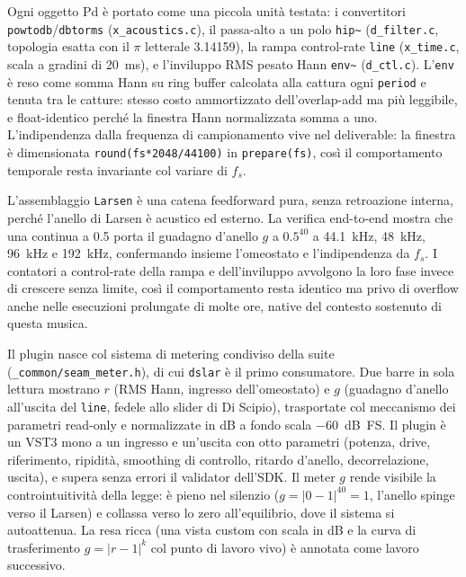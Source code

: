 \documentclass[11pt,a4paper]{article}
\begin{document}
Ogni oggetto Pd è portato come una piccola unità testata: i convertitori \texttt{powtodb}/\texttt{dbtorms} (\texttt{x\_acoustics.c}), il passa-alto a un polo \texttt{hip\textasciitilde} (\texttt{d\_filter.c}, topologia esatta con il $\pi$ letterale \num{3.14159}), la rampa control-rate \texttt{line} (\texttt{x\_time.c}, scala a gradini di \SI{20}{\milli\second}), e l'inviluppo RMS pesato Hann \texttt{env\textasciitilde} (\texttt{d\_ctl.c}).
L'\texttt{env} è reso come somma Hann su ring buffer calcolata alla cattura ogni \texttt{period} e tenuta tra le catture: stesso costo ammortizzato dell'overlap-add ma più leggibile, e float-identico perché la finestra Hann normalizzata somma a uno.
L'indipendenza dalla frequenza di campionamento vive nel deliverable: la finestra è dimensionata \texttt{round(fs*2048/44100)} in \texttt{prepare(fs)}, così il comportamento temporale resta invariante col variare di \(f_s\).

L'assemblaggio \texttt{Larsen} è una catena feedforward pura, senza retroazione interna, perché l'anello di Larsen è acustico ed esterno.
La verifica end-to-end mostra che una continua a \num{0.5} porta il guadagno d'anello \(g\) a \(0.5^{40}\) a \SI{44.1}{\kilo\hertz}, \SI{48}{\kilo\hertz}, \SI{96}{\kilo\hertz} e \SI{192}{\kilo\hertz}, confermando insieme l'omeostato e l'indipendenza da \(f_s\).
I contatori a control-rate della rampa e dell'inviluppo avvolgono la loro fase invece di crescere senza limite, così il comportamento resta identico ma privo di overflow anche nelle esecuzioni prolungate di molte ore, native del contesto sostenuto di questa musica.

Il plugin nasce col sistema di metering condiviso della suite (\texttt{\_common/seam\_meter.h}), di cui \texttt{dslar} è il primo consumatore.
Due barre in sola lettura mostrano \(r\) (RMS Hann, ingresso dell'omeostato) e \(g\) (guadagno d'anello all'uscita del \texttt{line}, fedele allo slider di Di Scipio), trasportate col meccanismo dei parametri read-only e normalizzate in dB a fondo scala \SI{-60}{\deci\bel FS}.
Il plugin è un VST3 mono a un ingresso e un'uscita con otto parametri (potenza, drive, riferimento, ripidità, smoothing di controllo, ritardo d'anello, decorrelazione, uscita), e supera senza errori il validator dell'SDK.
Il meter \(g\) rende visibile la controintuitività della legge: è pieno nel silenzio (\(g=|0-1|^{40}=1\), l'anello spinge verso il Larsen) e collassa verso lo zero all'equilibrio, dove il sistema si autoattenua.
La resa ricca (una vista custom con scala in dB e la curva di trasferimento \(g=|r-1|^k\) col punto di lavoro vivo) è annotata come lavoro successivo.



\end{document}
